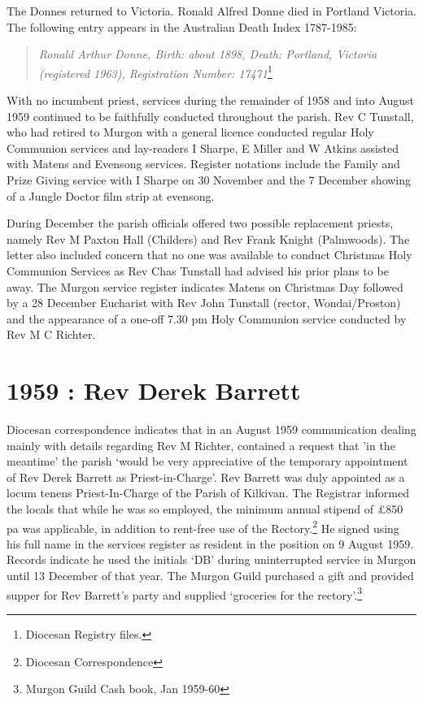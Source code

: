 The Donnes returned to Victoria. Ronald Alfred Donne died in Portland Victoria. The following entry appears in the Australian Death Index 1787-1985:



\begin{quote}

\emph{Ronald Arthur Donne, Birth: about 1898, Death: Portland, Victoria (registered 1963), Registration Number: 17471}\footnote{Diocesan Registry files.}
\end{quote}



With no incumbent priest, services during the remainder of 1958 and into August 1959 continued to be faithfully conducted throughout the parish. Rev C Tunstall, who had retired to Murgon with a general licence conducted regular Holy Communion services and lay-readers I Sharpe, E Miller and W Atkins assisted with Matens and Evensong services. Register notations include the Family and Prize Giving service with I Sharpe on 30 November and the 7 December showing of a Jungle Doctor film strip at evensong.



During December the parish officials offered two possible replacement priests, namely Rev M Paxton Hall (Childers) and Rev Frank Knight (Palmwoods). The letter also included concern that no one was available to conduct Christmas Holy Communion Services as Rev Chas Tunstall had advised his prior plans to be away. The Murgon service register indicates Matens on Christmas Day followed by a 28 December Eucharist with Rev John Tunstall (rector, Wondai/Proston) and the appearance of a one-off 7.30 pm Holy Communion service conducted by Rev M C Richter.



\section{1959 : Rev Derek Barrett}



Diocesan correspondence indicates that in an August 1959 communication dealing mainly with details regarding Rev M Richter, contained a request that 'in the meantime' the parish `would be very appreciative of the temporary appointment of Rev Derek Barrett as Priest-in-Charge'. Rev Barrett was duly appointed as a locum tenens Priest-In-Charge of the Parish of Kilkivan. The Registrar informed the locals that while he was so employed, the minimum annual stipend of \pounds850 pa was applicable, in addition to rent-free use of the Rectory.\footnote{Diocesan Correspondence} He signed using his full name in the services register as resident in the position on 9 August 1959. Records indicate he used the initials `DB' during uninterrupted service in Murgon until 13 December of that year. The Murgon Guild purchased a gift and provided supper for Rev Barrett's party and supplied `groceries for the rectory'.\footnote{Murgon Guild Cash book, Jan 1959-60}


